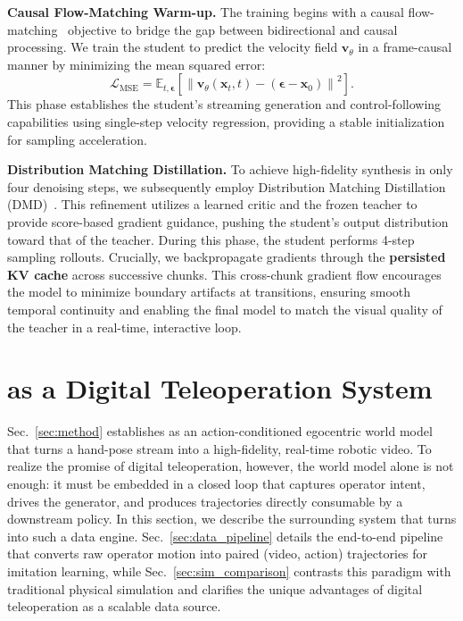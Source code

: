 \noindent 
\textbf{Causal Flow-Matching Warm-up.}
The training begins with a causal flow-matching~\citep{lipman2022flow} objective to bridge the gap between bidirectional and causal processing. We train the student to predict the velocity field $\mathbf{v}_\theta$ in a frame-causal manner by minimizing the mean squared error:
\begin{equation}
\mathcal{L}_{\text{MSE}} = \mathbb{E}_{t,\boldsymbol{\epsilon}}\left[\left\| \mathbf{v}_\theta(\mathbf{x}_t, t) - (\boldsymbol{\epsilon} - \mathbf{x}_0) \right\|^2\right].
\end{equation}
This phase establishes the student's streaming generation and control-following capabilities using single-step velocity regression, providing a stable initialization for sampling acceleration.

\noindent 
\textbf{Distribution Matching Distillation.}
To achieve high-fidelity synthesis in only four denoising steps, we subsequently employ Distribution Matching Distillation (DMD)~\citep{yin2024one}. This refinement utilizes a learned critic and the frozen teacher to provide score-based gradient guidance, pushing the student's output distribution toward that of the teacher. During this phase, the student performs 4-step sampling rollouts. Crucially, we backpropagate gradients through the \textbf{persisted KV cache} across successive chunks. This cross-chunk gradient flow encourages the model to minimize boundary artifacts at transitions, ensuring smooth temporal continuity and enabling the final model to match the visual quality of the teacher in a real-time, interactive loop.


\section{\our as a Digital Teleoperation System}

Sec.~\ref{sec:method} establishes \our as an action-conditioned egocentric world model that turns a hand-pose stream into a high-fidelity, real-time robotic video. To realize the promise of digital teleoperation, however, the world model alone is not enough: it must be embedded in a closed loop that captures operator intent, drives the generator, and produces trajectories directly consumable by a downstream policy. In this section, we describe the surrounding system that turns \our into such a data engine. Sec.~\ref{sec:data_pipeline} details the end-to-end pipeline that converts raw operator motion into paired (video, action) trajectories for imitation learning, while Sec.~\ref{sec:sim_comparison} contrasts this paradigm with traditional physical simulation and clarifies the unique advantages of digital teleoperation as a scalable data source.

